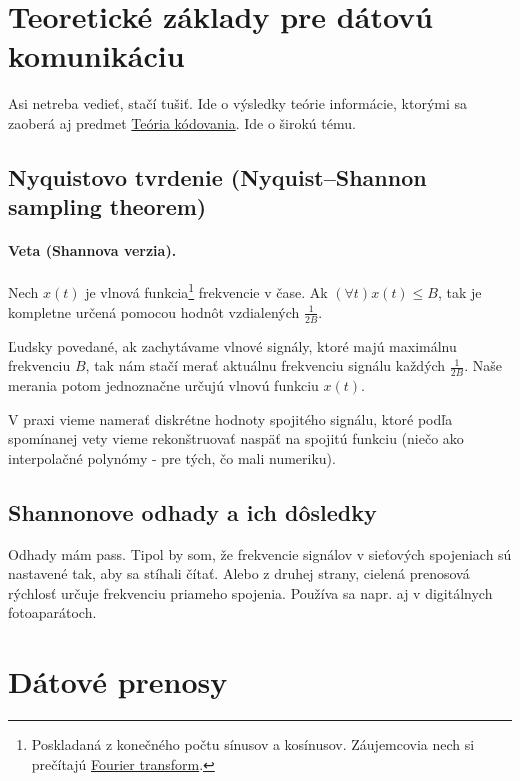 \documentclass[10pt,a4paper]{article}
\begin{document}
\section{Teoretické základy pre dátovú komunikáciu} 

Asi netreba vedieť, stačí tušiť. Ide o výsledky teórie informácie, ktorými sa zaoberá aj predmet \href{http://www.dcs.fmph.uniba.sk/texty/codebook.pdf}{Teória kódovania}. Ide o širokú tému. 

\subsection{Nyquistovo tvrdenie (Nyquist–Shannon sampling theorem)}             

\paragraph{Veta (Shannova verzia).} Nech $x(t)$ je vlnová funkcia\footnote{
Poskladaná z konečného počtu sínusov a kosínusov. Záujemcovia nech si prečítajú \href{http://en.wikipedia.org/wiki/Fourier_transform}{Fourier transform}.
} frekvencie v čase. Ak $(\forall t)x(t)\leq B$, tak je kompletne určená pomocou hodnôt vzdialených $\frac{1}{2B}$.

Ľudsky povedané, ak zachytávame vlnové signály, ktoré majú maximálnu frekvenciu $B$, tak nám stačí merať aktuálnu frekvenciu signálu každých $\frac{1}{2B}$. Naše merania potom jednoznačne určujú vlnovú funkciu $x(t)$.

V praxi vieme namerať diskrétne hodnoty spojitého signálu, ktoré podľa spomínanej vety vieme rekonštruovať naspäť na spojitú funkciu (niečo ako interpolačné polynómy - pre tých, čo mali numeriku). 
  
\subsection{Shannonove odhady a ich dôsledky}  
Odhady mám pass. 
Tipol by som, že frekvencie signálov v sieťových spojeniach sú nastavené tak, aby sa stíhali čítať. Alebo z druhej strany, cielená prenosová rýchlosť určuje frekvenciu priameho spojenia. 
Používa sa napr. aj v digitálnych fotoaparátoch. 


\section{Dátové prenosy}     
\end{document}
